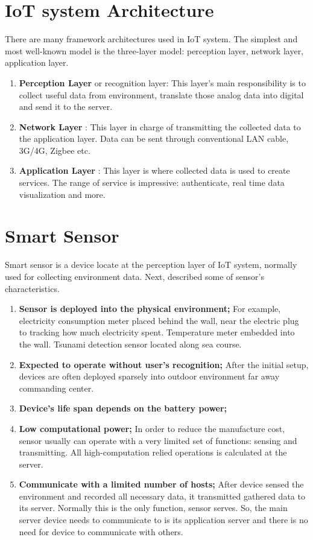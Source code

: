 \section{IoT system Architecture}
There are many framework architectures used in IoT system. The simplest and most well-known model is the three-layer model: perception layer, network layer, application layer.  

\begin{enumerate}
    \item \textbf{Perception Layer} or recognition layer: This layer’s main responsibility is to collect useful data from environment, translate those analog data into digital and send it to the server.
    \item \textbf{Network Layer} : This layer in charge of transmitting the collected data to the application layer. Data can be sent through conventional LAN cable, 3G/4G, Zigbee etc.   
    \item \textbf{Application Layer} : This layer is where collected data is used to create services. The range of service is impressive: authenticate, real time data visualization and more. 
\end{enumerate}

\section{Smart Sensor}
Smart sensor is a device locate at the perception layer of IoT system, normally used for collecting environment data. Next, described some of sensor’s characteristics. 

\begin{enumerate}
    \item \textbf{Sensor is deployed into the physical environment;}     For example, electricity consumption meter placed behind the wall, near the electric plug to tracking how much electricity spent. Temperature meter embedded into the wall. Tsunami detection sensor located along sea course. 
    \item \textbf{Expected to operate without user’s recognition;}     After the initial setup, devices are often deployed sparsely into outdoor environment far away commanding center.  
    \item \textbf{Device’s life span depends on the battery power;}
    \item \textbf{Low computational power;}     In order to reduce the manufacture cost, sensor usually can operate with a very limited set of functions: sensing and transmitting. All high-computation relied operations is calculated at the server. 
    \item \textbf{Communicate with a limited number of hosts;}     After device sensed the environment and recorded all necessary data, it transmitted gathered data to its server. Normally this is the only function, sensor serves. So, the main server device needs to communicate to is its application server and there is no need for device to communicate with others.    
\end{enumerate}

